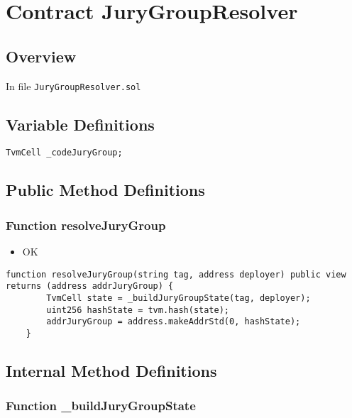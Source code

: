 
\chapter{Contract JuryGroupResolver}

\minitoc

\section{Overview}


In file {\tt JuryGroupResolver.sol}

\section{Variable Definitions}

\begin{lstlisting}[firstnumber=6]
    TvmCell _codeJuryGroup;
\end{lstlisting}

\section{Public Method Definitions}


\subsection{Function resolveJuryGroup}

\begin{itemize}
\item OK
\end{itemize}

\begin{lstlisting}[firstnumber=8]
    function resolveJuryGroup(string tag, address deployer) public view returns (address addrJuryGroup) {
        TvmCell state = _buildJuryGroupState(tag, deployer);
        uint256 hashState = tvm.hash(state);
        addrJuryGroup = address.makeAddrStd(0, hashState);
    }
\end{lstlisting}

\section{Internal Method Definitions}


\subsection{Function \_{}buildJuryGroupState}

